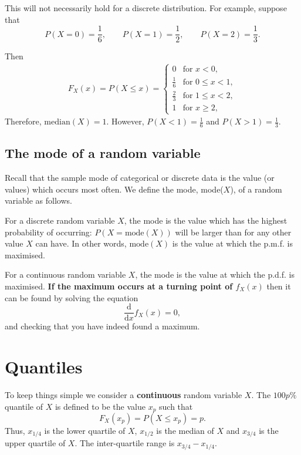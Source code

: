 \documentclass[
  british,
]{book}
\begin{document}
This will not necessarily hold for a discrete distribution. For example, suppose that
\[ P(X=0)=\frac16, \qquad  P(X=1)=\frac12, \qquad P(X=2)=\frac13. \]

Then
\begin{eqnarray*}
F_X(x) = P(X \leq x) = \left\{\begin{array}{ll}
0 & \mbox{for } x <0, \\
\frac16 & \mbox{for } 0 \leq x < 1, \\
\frac23 & \mbox{for } 1 \leq x < 2, \\
1 & \mbox{for } x \geq 2, 
\end{array}\right.
\end{eqnarray*}
Therefore, \(\mathrm{median}(X) = 1\). However, \(P(X<1)=\frac16\) and \(P(X>1)=\frac13\).

\hypertarget{the-mode-of-a-random-variable}{%
\subsection{The mode of a random variable}\label{the-mode-of-a-random-variable}}

Recall that the sample mode of categorical or discrete data is the value (or values) which occurs most often. We define the mode, mode(\(X\)), of a random variable as follows.

For a discrete random variable \(X\), the mode is the value which has the highest probability of occurring: \(P(X=\mathrm{mode}(X))\) will be larger than for any other value \(X\) can have. In other words, \(\mathrm{mode}(X)\) is the value at which the p.m.f. is maximised.

For a continuous random variable \(X\), the mode is the value at which the p.d.f. is maximised. \textbf{If the maximum occurs at a turning point of \(f_X(x)\)} then it can be found by solving the equation
\[ \frac{\mathrm{d}}{\mathrm{d}x} f_X(x)  = 0, \]
and checking that you have indeed found a maximum.

\hypertarget{quantiles}{%
\section{Quantiles}\label{quantiles}}

To keep things simple we consider a \textbf{continuous} random variable \(X\). The \(100p\%\) quantile of \(X\) is defined to be the value \(x_p\) such that
\[ F_X(x_p)=P(X \leq x_p) = p. \]
Thus, \(x_{1/4}\) is the lower quartile of \(X\), \(x_{1/2}\) is the median of \(X\) and \(x_{3/4}\) is the upper quartile of \(X\). The inter-quartile range is \(x_{3/4}-x_{1/4}\).
\end{document}
